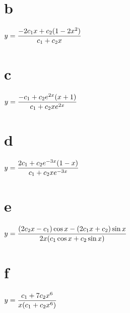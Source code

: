 \part{b} $y=\displaystyle{\frac{-2c_{1}x+c_{2}(1-2x^{2})}{c_{1}+c_{2}x}}$ \\ [2\jot]

\quad \quad \part{c} $y=\displaystyle{\frac{-c_{1}+c_{2}e^{2x}(x+1)}{c_{1}+c_{2}xe^{2x}}}$\;
\part{d}
$y=\displaystyle{\frac{2c_{1}+c_{2}e^{-3x}(1-x)}{c_{1}+c_{2}xe^{-3x}}}$

\quad \quad \part{e} $y=\displaystyle{\frac{(2c_{2}x-c_{1})\cos x-(2c_{1}x+c_{2})\sin x}{2x(c_{1}\cos x+c_{2}\sin x)}}$
\;  \part{f}  $y=\displaystyle\frac{c_{1}+7c_{2}x^{6}}{x(c_{1}+c_{2}x^{6})}$

